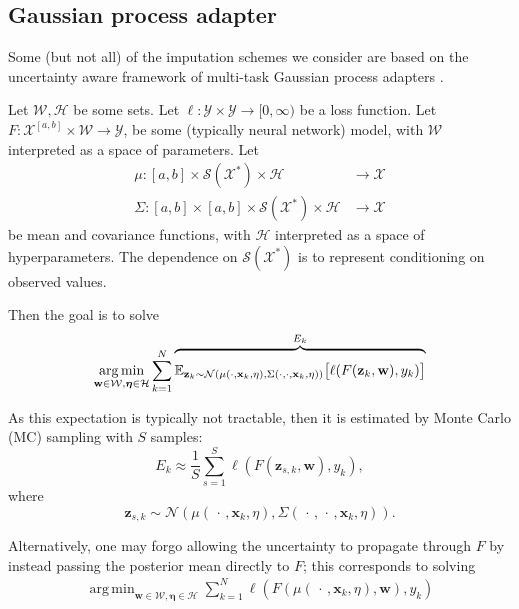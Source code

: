 \documentclass{article}
\DeclareMathOperator*{\argmin}{arg\,min}
\newcommand{\dataspace}{\mathcal{X}}
\newcommand{\lspace}{\mathcal{Y}}
\newcommand{\seriesspace}{\mathcal{S}}
\begin{document}
\subsection{Gaussian process adapter}\label{section:gpadapter}
Some (but not all) of the imputation schemes we consider are based on the uncertainty aware framework of multi-task Gaussian process adapters \citep{li2016scalable, futoma2017mgp}.

Let $\mathcal{W}, \mathcal{H}$ be some sets. Let $\ell \colon \lspace \times \lspace \to [0, \infty)$ be a loss function. Let $F \colon \dataspace^{[a, b]} \times \mathcal{W} \to \lspace$, be some (typically neural network) model, with $\mathcal{W}$ interpreted as a space of parameters. Let
\begin{align*}
\mu \colon [a, b] \times \seriesspace(\dataspace^*) \times \mathcal{H} &\to \dataspace\\
\Sigma \colon [a, b] \times [a, b] \times \seriesspace(\dataspace^*) \times \mathcal{H} &\to \dataspace    
\end{align*}
be mean and covariance functions, with $\mathcal{H}$ interpreted as a space of hyperparameters. The dependence on $\seriesspace(\dataspace^*)$ is to represent conditioning on observed values.

Then the goal is to solve
\begin{equation}\label{eq:gp-mc}
\argmin_{\mathbf{w} \in \mathcal{W},\bm{\eta} \in \mathcal{H}} \sum_{k=1}^N \overbrace{\rule{0pt}{0.5cm} \mathbb{E}_{\mathbf{z}_k \sim \mathcal{N}\left( \mu(\cdot, \mathbf{x}_k, \eta), \Sigma(\cdot, \cdot, \mathbf{x}_k, \eta)\right) } \big[ \ell(F(\mathbf{z}_k, \mathbf{w}), y_k) \big] }^{\text{$E_k$}} 
\end{equation}

As this expectation is typically not tractable, then it is estimated by Monte Carlo (MC) sampling with $S$ samples:
\begin{equation*}
E_k \approx \frac{1}{S} \sum_{s=1}^{S} \ell(F(\mathbf{z}_{s, k}, \mathbf{w}), y_k),
\end{equation*}
where
\begin{equation*}
    \mathbf{z}_{s, k} \sim \mathcal{N}\left( \mu(\,\cdot\,, \mathbf{x}_k, \eta), \Sigma(\,\cdot\,, \,\cdot\,, \mathbf{x}_k, \eta)\right).
\end{equation*}

Alternatively, one may forgo allowing the uncertainty to propagate through $F$ by instead passing the posterior mean directly to $F$; this corresponds to solving
\begin{align}\label{eq:gp-mean}
\argmin_{\mathbf{w} \in \mathcal{W},\bm{\eta} \in \mathcal{H}} \sum_{k=1}^N \ell(F(\mu(\,\cdot\,,\mathbf{x}_k, \eta), \mathbf{w}), y_k)
\end{align}
\end{document}
